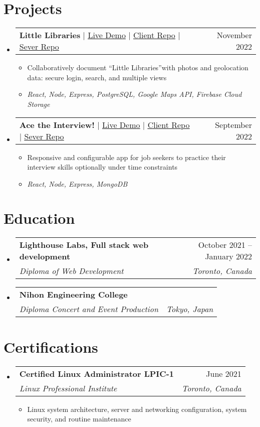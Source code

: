 \documentclass[letterpaper,11pt]{article}
\makeatletter
\newcommand{\resumeItem}[1]{
  \item\small{
    {#1 \vspace{-2pt}}
  }
}
\newcommand{\resumeSubheading}[4]{
  \vspace{-2pt}\item
    \begin{tabular*}{0.97\textwidth}[t]{l@{\extracolsep{\fill}}r}
      \textbf{#1} & #2 \\
      \textit{\small#3} & \textit{\small #4} \\
    \end{tabular*}\vspace{-7pt}
}
\newcommand{\resumeProjectHeading}[2]{
    \item
    \begin{tabular*}{0.97\textwidth}{l@{\extracolsep{\fill}}r}
      \small#1 & #2 \\
    \end{tabular*}\vspace{-7pt}
}
\newcommand{\resumeSubHeadingListStart}{\begin{itemize}[leftmargin=0.15in, label={}]}
\newcommand{\resumeSubHeadingListEnd}{\end{itemize}}
\newcommand{\resumeItemListStart}{\begin{itemize}}
\newcommand{\resumeItemListEnd}{\end{itemize}\vspace{-5pt}}
\makeatother
\begin{document}
\section{Projects}
    \resumeSubHeadingListStart
    \resumeProjectHeading
          {\textbf{Little Libraries} $|$ \href{https://littlelibraries.netlify.app/}{\underline{Live Demo}} $|$ \href{https://github.com/CarlSmoky/little_libraries_client}{\underline{Client Repo}} $|$ \href{https://github.com/CarlSmoky/little_libraries}{\underline{Sever Repo}}}{November 2022}
          \resumeItemListStart
            \resumeItem{Collaboratively document “Little Libraries”with photos and geolocation data:  secure login, search, and multiple views}
            \resumeItem{\emph{React, Node, Express, PostgreSQL, Google Maps API, Firebase Cloud Storage}}
          \resumeItemListEnd
      \resumeProjectHeading
          {\textbf{Ace the Interview!} $|$ \href{https://acetheinterview.netlify.app/}{\underline{Live Demo}} $|$ \href{https://github.com/CarlSmoky/interview_client}{\underline{Client Repo}} $|$ \href{https://github.com/CarlSmoky/interview-server}{\underline{Sever Repo}} }{September 2022}
          \resumeItemListStart
            \resumeItem{Responsive and configurable app for job seekers to practice their interview skills optionally under time constraints}
            \resumeItem{\emph{React, Node, Express, MongoDB}}
          \resumeItemListEnd
    \resumeSubHeadingListEnd



%


\section{Education}
  \resumeSubHeadingListStart
    \resumeSubheading
      {Lighthouse Labs, Full stack web development}{October 2021 -- January 2022}
      {Diploma of Web Development}{Toronto, Canada}
    \resumeSubheading
      {Nihon Engineering College}{}
      {Diploma Concert and Event Production}{Tokyo, Japan}
  \resumeSubHeadingListEnd



\section{Certifications}
  \resumeSubHeadingListStart
    \resumeSubheading
      {Certified Linux Administrator LPIC-1}{June 2021}
      {Linux Professional Institute}{Toronto, Canada}
     \resumeItemListStart
        \resumeItem{}
          {Linux system architecture, server and networking configuration, system security, and routine maintenance}
     \resumeItemListEnd
  \resumeSubHeadingListEnd


\end{document}
